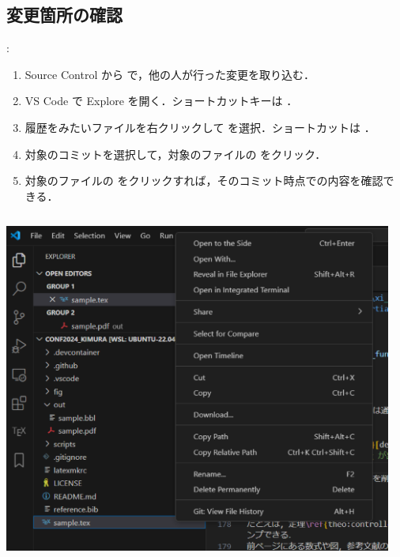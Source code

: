 \documentclass[aspectratio=169,dvipdfmx,cjk]{beamer}
\begin{document}
\subsection{変更箇所の確認}
\begin{frame}{\insertsection \thesubsection: \insertsubsection}
  \begin{enumerate}
    \item Source Control から  で，他の人が行った変更を取り込む．
    \item VS Code で Explore を開く．ショートカットキーは ．
    \item 履歴をみたいファイルを右クリックして を選択．ショートカットは ．
    \item 対象のコミットを選択して，対象のファイルの  をクリック．
    \item 対象のファイルの  をクリックすれば，そのコミット時点での内容を確認できる．
  \end{enumerate}
  \begin{columns}
    \begin{column}{0.3\textwidth}
        \includegraphics[width=1.0\linewidth]{fig/git-history1.png}
    \end{column}
    \begin{column}{0.3\textwidth}

\end{column}
\end{columns}
\end{frame}
\end{document}

